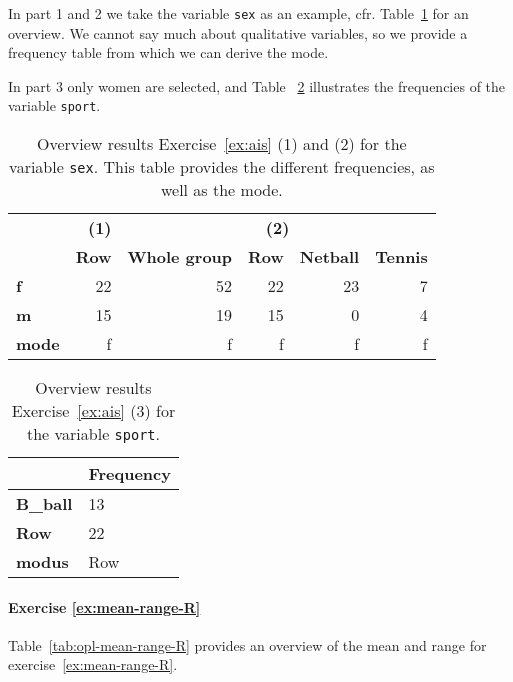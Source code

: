 In part 1 and 2 we take the variable \texttt{sex} as an example, cfr. Table~\ref{tab:opl-ais-sex} for an overview.
We cannot say much about qualitative variables, so we provide a frequency table from which we can derive the mode.

In part 3 only women are selected, and Table~ \ref{tab:opl-ais-sport} illustrates the frequencies of the variable \texttt{sport}.

\begin{table}
  \centering
  \begin{tabular}{@{}l|r|rrrr}
  	\toprule
  	               & \textbf{(1)} &                    \multicolumn{4}{c}{\textbf{(2)}}                     \\
  	               & \textbf{Row} & \textbf{Whole group}& \textbf{Row} & \textbf{Netball} & \textbf{Tennis} \\ \midrule
  	\textbf{f}     &           22 &                  52 &           22 &               23 &               7 \\
  	\textbf{m}     &           15 &                  19 &           15 &                0 &               4 \\
  	\textbf{mode}  &            f &                   f &            f &                f &               f \\ \bottomrule
  \end{tabular}
  \caption{Overview results Exercise~\ref{ex:ais} (1) and (2) for the variable \texttt{sex}. This table provides the different frequencies, as well as the mode.}
  \label{tab:opl-ais-sex}
\end{table}

\begin{table}
  \centering
  \begin{tabular}{@{}l|l}
  	\toprule
  	                 & Frequency   \\ \midrule
  	\textbf{B\_ball} & 13          \\
  	\textbf{Row}     & 22          \\
  	\textbf{modus}   & Row         \\ \bottomrule
  \end{tabular}
  \caption{Overview results Exercise~\ref{ex:ais} (3) for the variable \texttt{sport}.}
  \label{tab:opl-ais-sport}
\end{table}


\paragraph{Exercise \ref{ex:mean-range-R}}
Table~\ref{tab:opl-mean-range-R} provides an overview of the mean and range for exercise~\ref{ex:mean-range-R}.

